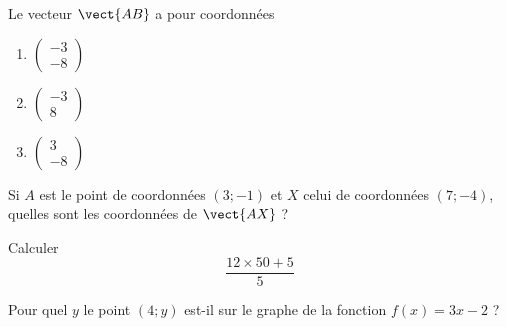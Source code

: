 \begin{MentalActivity}


\begin{mental}

        \begin{center}
   
        \end{center}

                Le vecteur \( \vect{ AB }\) a pour coordonnées 
                \begin{enumerate}
                    \item
        $                
    \begin{pmatrix}
       -3 \\ 
       -8 
   \end{pmatrix}$
   \item
   \( \begin{pmatrix}
       -3 \\ 
       8 
   \end{pmatrix}\)
   \item
   \( \begin{pmatrix}
       3 \\ 
       -8 
   \end{pmatrix}\)
                \end{enumerate}
            
\end{mental}

\begin{mental}

            Si \( A\) est le point de coordonnées \( (3;-1)\) et \( X\) celui de coordonnées \( (7;-4)\), quelles sont les coordonnées de \( \vect{ AX }\) ?

\end{mental}

\begin{mental}

    Calculer
    \begin{equation*}
        \frac{ 12\times 50+5 }{ 5 }
    \end{equation*}


\end{mental}

\begin{mental}

    Pour quel \( y\) le point \( (4;y)\) est-il sur le graphe de la fonction \( f(x)=3x-2\) ?

\end{mental}


\end{MentalActivity}
